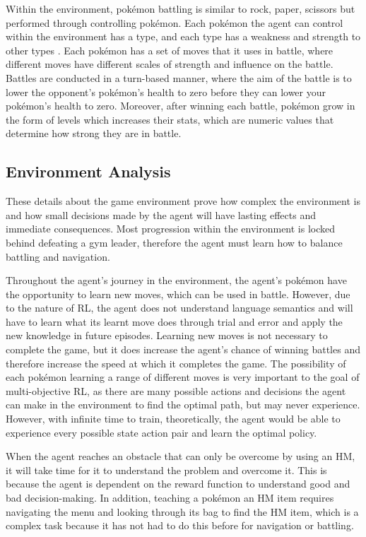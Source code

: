 Within the environment, pokémon battling is similar to rock, paper, scissors but performed through controlling pokémon. Each pokémon the agent can control within the environment has a type, and each type has a weakness and strength to other types \cite{SerebiiTeam2016}. Each pokémon has a set of moves that it uses in battle, where different moves have different scales of strength and influence on the battle. Battles are conducted in a turn-based manner, where the aim of the battle is to lower the opponent's pokémon's health to zero before they can lower your pokémon's health to zero. Moreover, after winning each battle, pokémon grow in the form of levels which increases their stats, which are numeric values that determine how strong they are in battle. 


\subsection{Environment Analysis}

These details about the game environment prove how complex the environment is and how small decisions made by the agent will have lasting effects and immediate consequences. Most progression within the environment is locked behind defeating a gym leader, therefore the agent must learn how to balance battling and navigation. 

Throughout the agent's journey in the environment, the agent's pokémon have the opportunity to learn new moves, which can be used in battle. However, due to the nature of RL, the agent does not understand language semantics and will have to learn what its learnt move does through trial and error and apply the new knowledge in future episodes. Learning new moves is not necessary to complete the game, but it does increase the agent's chance of winning battles and therefore increase the speed at which it completes the game. The possibility of each pokémon learning a range of different moves is very important to the goal of multi-objective RL, as there are many possible actions and decisions the agent can make in the environment to find the optimal path, but may never experience. However, with infinite time to train, theoretically, the agent would be able to experience every possible state action pair and learn the optimal policy. 

When the agent reaches an obstacle that can only be overcome by using an HM, it will take time for it to understand the problem and overcome it. This is because the agent is dependent on the reward function to understand good and bad decision-making. In addition, teaching a pokémon an HM item requires navigating the menu and looking through its bag to find the HM item, which is a complex task because it has not had to do this before for navigation or battling.

